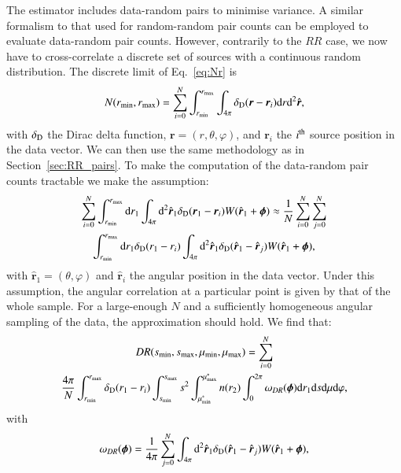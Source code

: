 \documentclass{aa}
\newcommand{\dd}{\mathrm{d}}
\begin{document}
The \citet{landy1993bias} estimator includes data-random pairs to minimise variance. A similar formalism to that used for random-random pair counts can be employed to evaluate data-random pair counts. However, contrarily to the $RR$ case, we now have to cross-correlate a discrete set of sources with a continuous random distribution. The discrete limit of Eq.~\eqref{eq:Nr} is
%
\begin{equation}
    N(r_{\rm min}, r_{\rm max}) = \sum_{i=0}^N \int_{r_{\rm min}}^{r_{\rm max}}\int_{4\pi}\delta_{\rm D}(\bm{r}-\bm{r}_i)\dd r\dd^2\hat{\bm{r}},
    \label{eq:Nr_discrete}
\end{equation}
%
with $\delta_{\rm D}$ the Dirac delta function, $\bm{r} = (r, \theta, \varphi)$, and $\bm{r}_i$ the $i^{\rm th}$ source position in the data vector. We can then use the same methodology as in Section~\ref{sec:RR_pairs}. To make the computation of the data-random pair counts tractable we make the assumption:
%
\begin{multline}
     \sum_{i=0}^N\int_{r_{\rm min}}^{r_{\rm max}} \dd r_1\int_{4\pi} \dd^2\hat{\bm{r}}_1\delta_{\rm D}(\bm{r}_1-\bm{r}_i)W(\hat{\bm{r}}_1+\bm{\phi})  \approx \frac{1}{N} \sum_{i=0}^N \sum_{j=0}^N \\
   \int_{r_{\rm min}}^{r_{\rm max}} \dd r_1\delta_{\rm D}(r_1 - r_i) \int_{4\pi} \dd^2\hat{\bm{r}}_1\delta_{\rm D}(\hat{\bm{r}}_1-\hat{\bm{r}}_j)W(\hat{\bm{r}}_1+\bm{\phi}), 
  \label{eq:approx_DR}
\end{multline}
%
with $\hat{\bm{r}}_1 = (\theta, \varphi)$ and $\hat{\bm{r}}_i$ the angular position in the data vector. Under this assumption, the angular correlation at a particular point is given by that of the whole sample. For a large-enough $N$ and a sufficiently homogeneous angular sampling of the data, the approximation should hold. We find that:
%
\begin{multline}
    DR(s_{\rm min}, s_{\rm max}, \mu_{\rm min}, \mu_{\rm max}) =   \sum_{i=0}^N \\
    \frac{4\pi}{N} \int_{r_{\rm min}}^{r_{\rm max}}\delta_{\rm D}(r_1-r_i)\int_{s_{\rm min}}^{s_{\rm max}}s^2 
    \int_{\mu^*_{\rm min}}^{\mu^*_{\rm max}}n(r_2)\int_0^{2\pi}\omega_{DR}(\bm{\phi})\dd r_1\dd s\dd\mu\dd\varphi,
\end{multline}
%
with
%
\begin{equation}
     \omega_{DR}(\bm{\phi}) =  \frac{1}{4\pi} \sum_{j=0}^N\int_{4\pi}\dd^2\hat{\bm{r}}_1\delta_{\rm D}(\hat{\bm{r}}_1-\hat{\bm{r}}_j)W(\hat{\bm{r}}_1+\bm{\phi}),
\end{equation}
\end{document}
